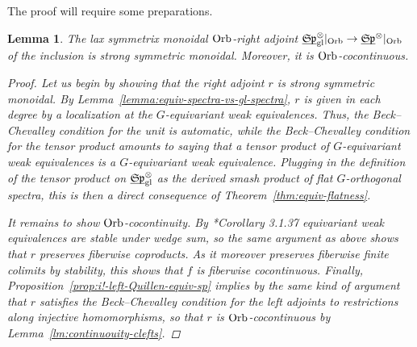 \documentclass[reqno]{memo-l}
\theoremstyle{mythm}
\newtheorem{lemma}[thm]{Lemma}
\theoremstyle{definition}
\numberwithin{equation}{section}
\newcommand{\gl}{\textup{gl}}
\newcommand{\Orb}{{\vphantom{\textup{t}}\smash{\textup{Orb}}}}
\newcommand{\ulhelper}[2]{\underline{\setbox0=\hbox{$#1#2$}\dp0=0.4pt \box0\relax}}
\newcommand{\ul}[1]{{\mathpalette\ulhelper{#1}}\hbox{\rule[-2pt]{0pt}{0pt}}}
\newcommand{\mySp}{{\mathfrak S\kern-.5pt\mathfrak p}}
\begin{document}
The proof will require some preparations.

\begin{lemma}
    The lax symmetrix monoidal $\Orb$-right adjoint $\ul\mySp_\gl^\otimes|_\Orb\to\ul\mySp^\otimes|_\Orb$ of the inclusion is strong symmetric monoidal. Moreover, it is $\Orb$-cocontinuous.
    \begin{proof}
        Let us begin by showing that the right adjoint $r$ is strong symmetric monoidal. By Lemma~\ref{lemma:equiv-spectra-vs-gl-spectra}, $r$ is given in each degree by a localization at the $G$-equivariant weak equivalences. Thus, the Beck--Chevalley condition for the unit is automatic, while the Beck--Chevalley condition for the tensor product amounts to saying that a tensor product of $G$-equivariant weak equivalences is a $G$-equivariant weak equivalence. Plugging in the definition of the tensor product on $\ul\mySp_\gl^\otimes$ as the derived smash product of flat $G$-orthogonal spectra, this is then a direct consequence of Theorem~\ref{thm:equiv-flatness}.
        
        It remains to show $\Orb$-cocontinuity. By \cite{schwede2018global}*{Corollary 3.1.37} equivariant weak equivalences are stable under wedge sum, so the same argument as above shows that $r$ preserves fiberwise coproducts. As it moreover preserves fiberwise finite colimits by stability, this shows that $f$ is fiberwise cocontinuous. Finally, Proposition~\ref{prop:i!-left-Quillen-equiv-sp} implies by the same kind of argument that $r$ satisfies the Beck--Chevalley condition for the left adjoints to restrictions along injective homomorphisms, so that $r$ is $\Orb$-cocontinuous by Lemma~\ref{lm:continuouity-clefts}.
    \end{proof}
\end{lemma}
\end{document}

